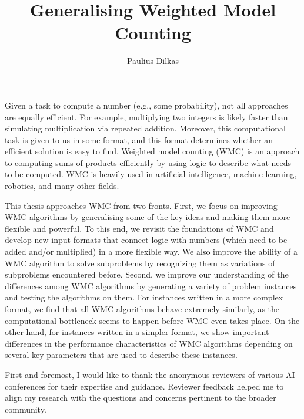 \documentclass[phd,aiai,twoside,fullspacing,logo]{infthesis}
\title{Generalising Weighted Model Counting}
\author{Paulius Dilkas}
\theoremstyle{definition}
\theoremstyle{remark}
\numberwithin{claim}{chapter}
\numberwithin{assumption}{chapter}
\numberwithin{conjecture}{chapter}
\numberwithin{constraint}{chapter}
\numberwithin{fact}{chapter}
\numberwithin{proposition}{chapter}
\numberwithin{theorem}{chapter}
\numberwithin{lemma}{chapter}
\numberwithin{definition}{chapter}
\numberwithin{example}{chapter}
\numberwithin{experiment}{chapter}
\begin{document}
\nobibliography*

\begin{preliminary}

\maketitle

\begin{laysummary}
  Given a task to compute a number (e.g., some probability), not all approaches
  are equally efficient. For example, multiplying two integers is likely faster
  than simulating multiplication via repeated addition. Moreover, this
  computational task is given to us in some format, and this format determines
  whether an efficient solution is easy to find. Weighted model counting (WMC)
  is an approach to computing sums of products efficiently by using logic to
  describe what needs to be computed. WMC is heavily used in artificial
  intelligence, machine learning, robotics, and many other fields.

  This thesis approaches WMC from two fronts. First, we focus on improving WMC
  algorithms by generalising some of the key ideas and making them more flexible
  and powerful. To this end, we revisit the foundations of WMC and develop new
  input formats that connect logic with numbers (which need to be added and/or
  multiplied) in a more flexible way. We also improve the ability of a WMC
  algorithm to solve subproblems by recognizing them as variations of
  subproblems encountered before. Second, we improve our understanding of the
  differences among WMC algorithms by generating a variety of problem instances
  and testing the algorithms on them. For instances written in a more complex
  format, we find that all WMC algorithms behave extremely similarly, as the
  computational bottleneck seems to happen before WMC even takes place. On the
  other hand, for instances written in a simpler format, we show important
  differences in the performance characteristics of WMC algorithms depending on
  several key parameters that are used to describe these instances.
\end{laysummary}

\begin{acknowledgements}
  First and foremost, I would like to thank the anonymous reviewers of various
  AI conferences for their expertise and guidance. Reviewer feedback helped me
  to align my research with the questions and concerns pertinent to the broader
  community.


\end{acknowledgements}
\end{preliminary}
\end{document}
